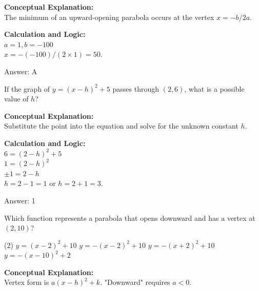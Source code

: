 \documentclass[11pt,paper=a4,answers]{exam}
\begin{document}
\begin{questions}
\begin{solution}
\textbf{Conceptual Explanation:} \\
The minimum of an upward-opening parabola occurs at the vertex $x = -b/2a$.

\vspace{20pt}

\textbf{Calculation and Logic:} \\
$a = 1, b = -100$ \\
$x = -(-100) / (2 \times 1) = 50$.

\vspace{25pt}

Answer: \colorbox{yellow!100}{A}
\end{solution}

\vspace{40pt}

\question
If the graph of $y = (x-h)^2 + 5$ passes through $(2, 6)$, what is a possible value of $h$?

\begin{solution}
\textbf{Conceptual Explanation:} \\
Substitute the point into the equation and solve for the unknown constant $h$.

\vspace{20pt}

\textbf{Calculation and Logic:} \\
$6 = (2-h)^2 + 5$ \\
$1 = (2-h)^2$ \\
$\pm 1 = 2 - h$ \\
$h = 2-1=1$ or $h = 2+1=3$.

\vspace{25pt}

Answer: \colorbox{yellow!100}{1}
\end{solution}

\vspace{40pt}

\question
Which function represents a parabola that opens downward and has a vertex at $(2, 10)$?
\begin{tasks}(2)
    \task $y = (x-2)^2 + 10$
    \task $y = -(x-2)^2 + 10$
    \task $y = -(x+2)^2 + 10$
    \task $y = -(x-10)^2 + 2$
\end{tasks}

\begin{solution}
\textbf{Conceptual Explanation:} \\
Vertex form is $a(x-h)^2+k$. "Downward" requires $a < 0$.


\end{solution}
\end{questions}
\end{document}
